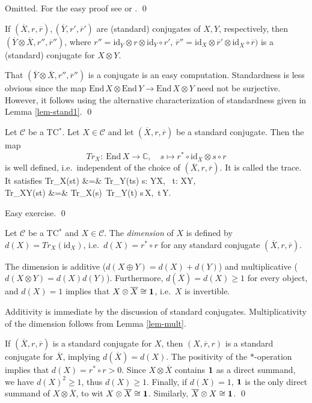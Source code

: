 \documentclass[12pt]{article}
\theoremstyle{definition}
\theoremstyle{definition}
\theoremstyle{remark}
\def\2#1{{\mathcal #1}}
\def\7#1{{\mathbb #1}}
\def\1#1{{\bf #1}}
\def\ol#1{{\overline #1}}
\newcommand{\End}{\mathrm{End}}
\newcommand{\mcirc}{\circ}
\newcommand{\rarr}{\rightarrow}
\def\id{\mathrm{id}}
\newcounter{bean}
\begin{document}
\prf Omitted. For the easy proof see \cite{LR} or \cite{mue06}.
\qed




\blemma \label{lem-mult}
If $(\ol{X},r,\ol{r}),(\ol{Y},r',\ol{r}')$ are (standard) conjugates of $X,Y$, respectively, then
$(\ol{Y}\otimes\ol{X}, r'',\ol{r}'')$, where $r''=\id_{\ol{Y}}\otimes r\otimes\id_Y\circ r'$,
$\ol{r}''=\id_X\otimes\ol{r'}\otimes\id_{\ol{X}}\circ\ol{r})$ 
is a (standard) conjugate for $X\otimes Y$.
\elemma

\prf That $(\ol{Y}\otimes\ol{X}, r'',\ol{r}'')$ is a conjugate is an easy computation. Standardness
is less obvious since the map $\End\,X\otimes\End\,Y\rarr\End\,X\otimes Y$ need not be
surjective. However, it follows using the alternative characterization of standardness given in
Lemma \ref{lem-stand1}.
\qed

\bprop \label{prop-trace} 
Let $\2C$ be a TC$^*$. Let
$X\in\2C$ and let $(\ol{X}, r,\ol{r})$ be a standard conjugate. Then the map
\[ Tr_X: \ \End\,X\rarr\7C,\quad s\mapsto r^*\mcirc \id_{\ol{X}}\otimes s\mcirc r \]
is well defined, i.e.\ independent of the choice of $(\ol{X}, r,\ol{r})$. It is called the trace. It
satisfies
\bean Tr_X(s\mcirc  t) &=& Tr_Y(t\mcirc  s) \quad\forall s: Y\rarr X, \ t: X\rarr Y,  \\
  Tr_{X\otimes Y}(s\otimes t) &=& Tr_X(s)\, Tr_Y(t) \quad\forall s\in\End\,X,\ t\in\End\,Y. 
\eean
\eprop

\prf Easy exercise. \qed

\bdefin {}
Let $\2C$ be a TC$^*$ and $X\in\2C$. The \emph{dimension} of $X$ is defined by
$d(X)=Tr_X(\id_X)$, i.e.\ $d(X)=r^*\circ r$ for any standard conjugate $(\ol{X},r,\ol{r})$. 
\edefin

\blemma \label{lem-dim}
The dimension is additive ($d(X\oplus Y)=d(X)+d(Y)$) and multiplicative ($d(X\otimes Y)=d(X)d(Y)$).
Furthermore, $d(\ol{X})=d(X)\ge 1$ for every object, and $d(X)=1$ implies that $X\otimes\ol{X}\cong\11$,
i.e.\ $X$ is invertible.
\elemma

\prf Additivity is immediate by the discussion of standard conjugates. Multiplicativity of the
dimension follows from Lemma \ref{lem-mult}.

If $(\ol{X},r,\ol{r})$ is a standard conjugate for $X$, then $(X,\ol{r},r)$ is a standard conjugate
for $\ol{X}$, implying $d(\ol{X})=d(X)$. The positivity of the $*$-operation implies that
$d(X)=r^*\circ r>0$. Since $X\otimes\ol{X}$ contains $\11$ as a direct summand, we have
$d(X)^2\ge 1$, thus $d(X)\ge 1$. Finally, if $d(X)=1$, $\11$ is the only direct summand of
$X\otimes\ol{X}$, to wit $X\otimes\ol{X}\cong\11$. Similarly, $\ol{X}\otimes X\cong\11$.
\qed
\end{document}
